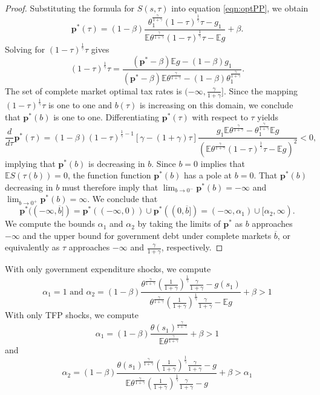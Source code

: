 \documentclass[12pt]{article}
\newcommand{\EE}{\mathbb E}
\begin{document}
\begin{proof}
Substituting the formula for $S(s,\tau)$ into equation \eqref{eqn:optPP}, we obtain
\[
	\bm p^*(\tau) = (1-\beta)\frac{\theta_1^\frac\gamma{1+\gamma}(1-\tau)^\frac1\gamma\tau-g_1}{\EE\theta^\frac\gamma{1+\gamma}(1-\tau)^\frac1\gamma\tau - \EE g} + \beta .
\]  Solving for $(1-\tau)^\frac1\gamma\tau$ gives
\[
	(1-\tau)^\frac{1}{\gamma}\tau = \frac{(\bm p^*-\beta)\EE g-(1-\beta)g_1}{(\bm p^* - \beta)\EE\theta^\frac{\gamma}{1+\gamma}-(1-\beta)\theta_1^\frac{\gamma}{1+\gamma}} .
\]  The set of complete market optimal tax rates is $(-\infty,\frac\gamma{1+\gamma}]$.  Since the mapping  $(1-\tau)^\frac1\gamma\tau$ is one to one
 and $b(\tau)$ is increasing on this domain, we conclude that $\bm p^*(b)$ is one to one. Differentiating $\bm p^*(\tau)$ with respect to $\tau$  yields
\[
	\frac{d}{d\tau} \bm p^*(\tau) = (1-\beta)(1-\tau)^{\frac1\gamma-1}\left[\gamma-(1+\gamma)\tau\right]\frac{g_1\EE\theta^\frac{\gamma}{1+\gamma}-\theta_1^\frac\gamma{1+\gamma}\EE g }{(\EE\theta^\frac\gamma{1+\gamma}(1-\tau)^\frac1\gamma\tau-\EE g)^2} <0,
\] implying that $\bm p^*(b)$ is decreasing in $b$. Since  $b =0$ implies that $\EE S(\tau(b)) =0$, the function function $\bm p^*(b)$ has a pole at $b = 0$.  That $\bm p^*(b)$ decreasing in $b$ must therefore imply that $\lim_{b\rightarrow0^{-} } \bm p^*(b) = -\infty$ and $\lim_{b\rightarrow 0^+} \bm p^*(b) = \infty$.  We conclude that
\[
	\bm p^*((-\infty,\overline b]) = \bm p^*((-\infty,0))\cup \bm p^*((0,\overline b]) = (-\infty,\alpha_1)\cup[\alpha_2,\infty).
\] We compute the bounds $\alpha_1$ and $\alpha_2$ by taking the limits of $\bm p^*$ as $b$ approaches $-\infty$ and the upper bound for government
debt under complete markets $\overline b$, or equivalently as $\tau$ approaches $-\infty$ and $\frac\gamma{1+\gamma}$, respectively.
\end{proof}
 With only government expenditure shocks, we compute
		\[
			\alpha_1 = 1 \text{  and }  \alpha_2 = (1-\beta)\frac{\theta^\frac{\gamma}{1+\gamma}\left(\frac{1}{1+\gamma}\right)^\frac1\gamma\frac{\gamma}{1+\gamma}-g(s_1)}{\theta^\frac{\gamma}{1+\gamma}\left(\frac{1}{1+\gamma}\right)^\frac1\gamma\frac{\gamma}{1+\gamma}-\EE g} +\beta>1
		\]
		With only TFP shocks, we compute
		\[
			\alpha_1 = (1-\beta)\frac{\theta(s_1)^\frac{\gamma}{1+\gamma}}{\EE\theta^\frac{\gamma}{1+\gamma}}+\beta > 1
		\]and
		\[
		\alpha_2 = (1-\beta)\frac{\theta(s_1)^\frac{\gamma}{1+\gamma}\left(\frac{1}{1+\gamma}\right)^\frac1\gamma\frac{\gamma}{1+\gamma}-g}{\EE\theta^\frac{\gamma}{1+\gamma}\left(\frac{1}{1+\gamma}\right)^\frac1\gamma\frac{\gamma}{1+\gamma}-g}+\beta>\alpha_1
		\]
\end{document}
